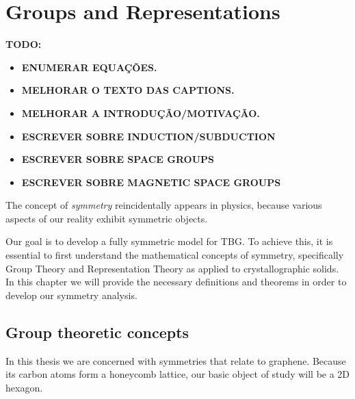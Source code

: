 


\chapter{Groups and Representations} \label{ch:group_theory}

\textbf{TODO:}
\begin{itemize}
\item \textbf{ENUMERAR EQUAÇÕES.}
\item \textbf{MELHORAR O TEXTO DAS CAPTIONS.}
\item \textbf{MELHORAR A INTRODUÇÃO/MOTIVAÇÃO.}
\item \textbf{ESCREVER SOBRE INDUCTION/SUBDUCTION}
\item \textbf{ESCREVER SOBRE SPACE GROUPS}
\item \textbf{ESCREVER SOBRE MAGNETIC SPACE GROUPS}
\end{itemize}

The concept of \textit{symmetry} reincidentally appears in physics, because various aspects of our reality exhibit symmetric objects.

Our goal is to develop a fully symmetric model for TBG. To achieve this, it is essential to first understand the mathematical concepts of symmetry, specifically Group Theory and Representation Theory as applied to crystallographic solids. In this chapter we will provide the necessary definitions and theorems in order to develop our symmetry analysis.

\section{Group theoretic concepts} \label{sec:group_theoretic_concepts}

In this thesis we are concerned with symmetries that relate to graphene. Because its carbon atoms form a honeycomb lattice, our basic object of study will be a 2D hexagon.

